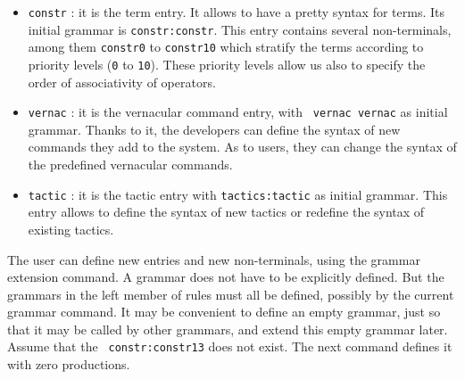 {\begin{itemize}
\begin{itemize}
\item \verb+var+ : variable grammar. Parses an identifier and builds
an AST which is a variable.
\item \verb+ident+ : identifier grammar. Parses an identifier and
builds an AST which is an identifier such as \verb+{x}+.
\item \verb+number+ : number grammar. Parses a positive integer.
\item \verb+string+ : string grammar. Parses a quoted string.
\item \verb+path+ : section path grammar.
\item \verb+ast+ : AST grammar.
\item \verb+astpat+ : AST pattern grammar.
\item \verb+astact+ : action grammar.
\end{itemize}

The primitive grammars are used as the other grammars; for instance
the variables of terms are parsed by \verb+prim:var($id)+.

\item \verb+constr+ : it is the term entry. It allows to have a pretty
syntax for terms. Its initial grammar is {\tt constr:constr}. This
entry contains several non-terminals, among them {\tt constr0} to
{\tt constr10} which stratify the terms according to priority levels
(\verb+0+ to \verb+10+). These priority levels allow us also to
specify the order of associativity of operators.


\item \verb+vernac+ : it is the vernacular command entry, with {\tt
  vernac vernac} as initial grammar. Thanks to it, the developers can
  define the syntax of new commands they add to the system. As to
  users, they can change the syntax of the predefined vernacular
  commands.

\item \verb+tactic+ : it is the tactic entry with {\tt tactics:tactic}
  as initial grammar. This entry allows to define the syntax of new
  tactics or redefine the syntax of existing tactics.

\end{itemize}

The user can define new entries and new non-terminals, using the
grammar extension command. A grammar does not have to be explicitly
defined. But the grammars in the left member of rules must all be
defined, possibly by the current grammar command. It may be convenient
to define an empty grammar, just so that it may be called by other
grammars, and extend this empty grammar later.  Assume that the {\tt
constr:constr13} does not exist. The next command defines it with
zero productions.

}
